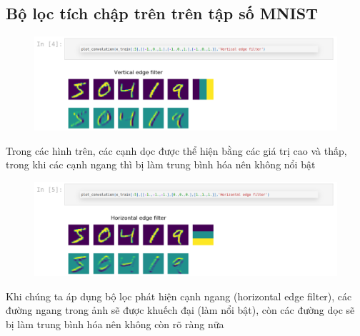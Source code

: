 \documentclass{book}
\begin{document}
    \subsection{Bộ lọc tích chập trên trên tập số MNIST}
    \begin{figure}[H]
        \centering
        \includegraphics[width=1.0\linewidth]{images/vMnist.png}
        \label{fig:hMnist}
    \end{figure}
    Trong các hình trên, các cạnh dọc được thể hiện bằng các giá trị cao và thấp, trong khi các cạnh ngang thì bị làm trung bình hóa nên không nổi bật
    \begin{figure}[H]
        \centering
        \includegraphics[width=1.0\linewidth]{images/hMnist.png}
        \label{fig:vMnist}
    \end{figure}
    Khi chúng ta áp dụng bộ lọc phát hiện cạnh ngang (horizontal edge filter), các đường ngang trong ảnh sẽ được khuếch đại (làm nổi bật), còn các đường dọc sẽ bị làm trung bình hóa nên không còn rõ ràng nữa
\end{document}
